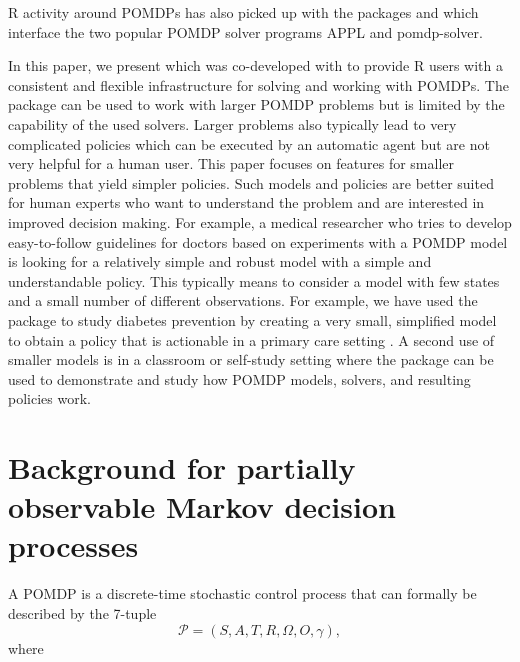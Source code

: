 R activity around POMDPs has also picked up with the packages  \citep{Bottiger2021} and  \citep{Hahsler2022b} which interface the
two popular POMDP solver programs APPL and pomdp-solver.

In this paper, we present  \citep{Hahsler2022} which was co-developed with
 \citep{Hahsler2022b} to provide R users with
a consistent and flexible infrastructure for solving and working with
POMDPs. The package can be used to work with larger POMDP problems but is limited
by the capability of the used solvers. Larger problems also typically lead to
very complicated policies which can be executed by an automatic agent but
are not very helpful for a human user. This paper
focuses on features for smaller problems that yield simpler policies. Such models and
policies are better suited for human experts who want to understand the problem and
are interested in improved decision making.
For example, a medical researcher who tries to
develop easy-to-follow guidelines for doctors based on experiments with a POMDP model
is looking for a relatively simple and robust model with a simple and
understandable policy.
This typically means
to consider a model with few states and a small number of different observations.
For example, we have used the package to study diabetes
prevention by creating a very small, simplified model
to obtain a policy that is actionable in a primary care setting \citep{hahsler:Kamalzadeh:2021}.
A second use of smaller models is in a classroom or self-study setting where the 
package can be used to demonstrate and study how POMDP models, solvers, and resulting
policies work.

\section{Background for partially observable Markov decision processes}\label{background-for-partially-observable-markov-decision-processes}

A POMDP is a discrete-time stochastic control process that can formally be described by the 7-tuple
\[\mathcal{P} = (S, A, T, R, \Omega , O, \gamma),\] where

